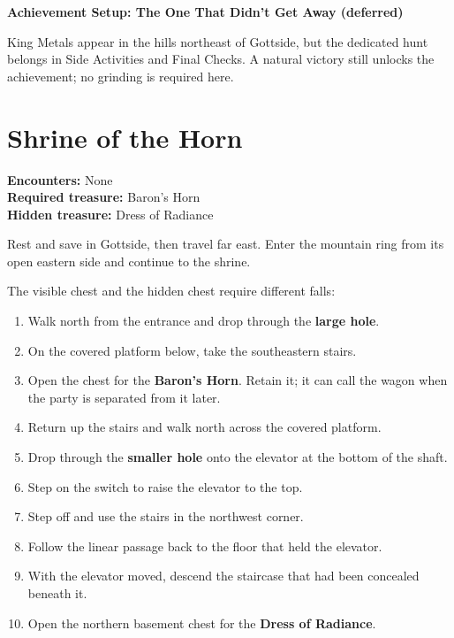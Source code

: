 \documentclass[
  american,
  10pt,
  letterpaper,
  oneside,
  open=any]{scrreprt}
\providecommand{\tightlist}{%
  \setlength{\itemsep}{0pt}\setlength{\parskip}{0pt}}
\begin{document}
\begin{achievementsetup}

\textbf{Achievement Setup: The One That Didn't Get Away (deferred)}

King Metals appear in the hills northeast of Gottside, but the dedicated
hunt belongs in Side Activities and Final Checks. A natural victory
still unlocks the achievement; no grinding is required here.

\end{achievementsetup}

\section{Shrine of the Horn}\label{shrine-of-the-horn}

\textbf{Encounters:} None\\
\textbf{Required treasure:} Baron's Horn\\
\textbf{Hidden treasure:} Dress of Radiance

Rest and save in Gottside, then travel far east. Enter the mountain ring
from its open eastern side and continue to the shrine.

The visible chest and the hidden chest require different falls:

\begin{enumerate}
\def\labelenumi{\arabic{enumi}.}
\tightlist
\item
  Walk north from the entrance and drop through the \textbf{large hole}.
\item
  On the covered platform below, take the southeastern stairs.
\item
  Open the chest for the \textbf{Baron's Horn}. Retain it; it can call
  the wagon when the party is separated from it later.
\item
  Return up the stairs and walk north across the covered platform.
\item
  Drop through the \textbf{smaller hole} onto the elevator at the bottom
  of the shaft.
\item
  Step on the switch to raise the elevator to the top.
\item
  Step off and use the stairs in the northwest corner.
\item
  Follow the linear passage back to the floor that held the elevator.
\item
  With the elevator moved, descend the staircase that had been concealed
  beneath it.
\item
  Open the northern basement chest for the \textbf{Dress of Radiance}.
\end{enumerate}
\end{document}
